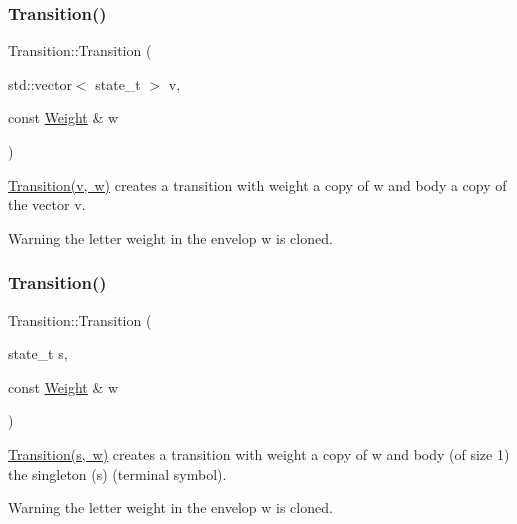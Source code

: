 \subsubsection{\texorpdfstring{Transition()}{Transition()}\hspace{0.1cm}{\footnotesize\ttfamily [2/3]}}
{\footnotesize\ttfamily Transition\+::\+Transition (\begin{DoxyParamCaption}\item[{std\+::vector$<$ state\+\_\+t $>$}]{v,  }\item[{const \mbox{\hyperlink{classWeight}{Weight}} \&}]{w }\end{DoxyParamCaption})}



\mbox{\hyperlink{classTransition}{Transition(v, w)}} creates a transition with weight a copy of w and body a copy of the vector v. 

\begin{DoxyWarning}{Warning}
the letter weight in the envelop w is cloned. 
\end{DoxyWarning}
\mbox{\label{group__schemata_ga3c71fb93c73a755408cc963975d4ffa5}} 
\subsubsection{\texorpdfstring{Transition()}{Transition()}\hspace{0.1cm}{\footnotesize\ttfamily [3/3]}}
{\footnotesize\ttfamily Transition\+::\+Transition (\begin{DoxyParamCaption}\item[{state\+\_\+t}]{s,  }\item[{const \mbox{\hyperlink{classWeight}{Weight}} \&}]{w }\end{DoxyParamCaption})}



\mbox{\hyperlink{classTransition}{Transition(s, w)}} creates a transition with weight a copy of w and body (of size 1) the singleton (s) (terminal symbol). 

\begin{DoxyWarning}{Warning}
the letter weight in the envelop w is cloned. 
\end{DoxyWarning}
\mbox{\label{group__schemata_ga97dce48d13fac75a4a444a68aae07608}} 
